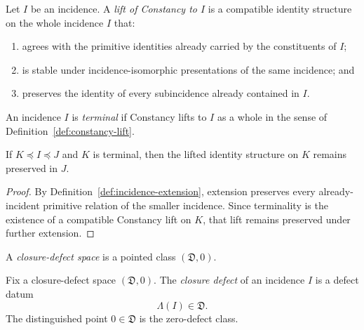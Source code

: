 \begin{definition}
\label{def:constancy-lift}
Let \(I\) be an incidence. A \emph{lift of Constancy to \(I\)} is a compatible
identity structure on the whole incidence \(I\) that:
\begin{enumerate}[label=(\roman*), leftmargin=2em, itemsep=0.2em]
\item agrees with the primitive identities already carried by the constituents
      of \(I\);
\item is stable under incidence-isomorphic presentations of the same
      incidence; and
\item preserves the identity of every subincidence already contained in \(I\).
\end{enumerate}
\end{definition}

\begin{definition}
\label{def:terminal-incidence}
An incidence \(I\) is \emph{terminal} if Constancy lifts to \(I\) as a whole in
the sense of Definition~\ref{def:constancy-lift}.
\end{definition}

\begin{proposition}
\label{prop:terminal-subincidence-inherited}
If \(K\preceq I\preceq J\) and \(K\) is terminal, then the lifted identity
structure on \(K\) remains preserved in \(J\).
\end{proposition}

\begin{proof}
By Definition~\ref{def:incidence-extension}, extension preserves every
already-incident primitive relation of the smaller incidence. Since
terminality is the existence of a compatible Constancy lift on \(K\), that
lift remains preserved under further extension.
\end{proof}

\begin{definition}
\label{def:closure-defect-space}
A \emph{closure-defect space} is a pointed class \((\mathfrak D,0)\).
\end{definition}

\begin{definition}
\label{def:closure-defect}
Fix a closure-defect space \((\mathfrak D,0)\). The \emph{closure defect} of
an incidence \(I\) is a defect datum
\[
\Lambda(I)\in\mathfrak D.
\]
The distinguished point \(0\in\mathfrak D\) is the zero-defect class.
\end{definition}

